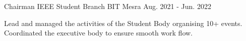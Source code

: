 

\begin{cventries}

  \cventry
    {Chairman} %
    {IEEE Student Branch} %
    {BIT Mesra} %
    {Aug. 2021 - Jun. 2022} %
    {
      \begin{cvitems} %
        \item {Lead  and managed the activities of the Student Body organising 10+ events. Coordinated the executive body to ensure smooth work flow.}
      \end{cvitems}
    }
\end{cventries}
